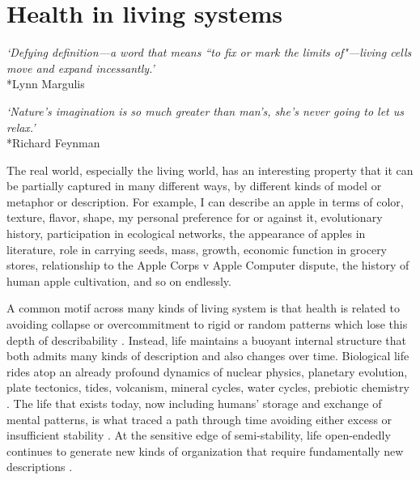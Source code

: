 \documentclass[12pt]{article}
\begin{document}
\section{Health in living systems}

\begin{center}
\textit{`Defying definition---a word that means ``to fix or mark the limits of"---living cells move and expand incessantly.'}\\*Lynn Margulis
\end{center}

\begin{center}
\textit{`Nature's imagination is so much greater than man's, she's never going to let us relax.'}\\*Richard Feynman
\end{center}

The real world, especially the living world, has an interesting property that it can be partially captured in many different ways, by different kinds of model or metaphor or description. For example, I can describe an apple in terms of color, texture, flavor, shape, my personal preference for or against it, evolutionary history, participation in ecological networks, the appearance of apples in literature, role in carrying seeds, mass, growth, economic function in grocery stores, relationship to the Apple Corps v Apple Computer dispute, the history of human apple cultivation, and so on endlessly.

A common motif across many kinds of living system is that health is related to avoiding collapse or overcommitment to rigid or random patterns which lose this depth of describability \citep{canguilhem1966normal, mackey1977oscillation, yachi1999biodiversity, deco2012ongoing, langton1990computation, gell1994quark, crutchfield1994calculi}. Instead, life maintains a buoyant internal structure that both admits many kinds of description and also changes over time. Biological life rides atop an already profound dynamics of nuclear physics, planetary evolution, plate tectonics, tides, volcanism, mineral cycles, water cycles, prebiotic chemistry \citep{smith2016origin, hazen2010mineral, stern2024importance, nisbet2001habitat, sleep2010hadean, baross1985submarine, wachtershauser1988before, martin2008hydrothermal, frank2024find, bregman2020humankind, virgo2011elongation, nowak2008prevolutionary}. The life that exists today, now including humans' storage and exchange of mental patterns, is what traced a path through time avoiding either excess or insufficient stability \citep{schrodinger1944what, bak2013nature, prigogine1984order, kirchhoff2018markov, langton1990computation, gell1994quark, crutchfield1994calculi}. At the sensitive edge of semi-stability, life open-endedly continues to generate new kinds of organization that require fundamentally new descriptions \citep{kauffman1993origins, stanley2017open, walker2004resilience, von1950theory,holling1973resilience, goldenfeld2011life}. 
\end{document}
